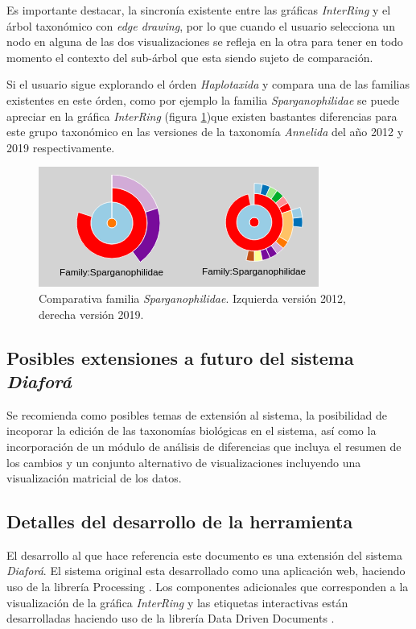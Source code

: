 \documentclass[journal]{IEEEtran}
\begin{document}
Es importante destacar, la sincronía existente entre las gráficas \emph{InterRing} y el árbol taxonómico con \emph{edge drawing}, por lo que cuando el usuario 
selecciona un nodo en alguna de las dos visualizaciones se refleja en la otra para tener en todo momento el contexto del sub-árbol que esta siendo sujeto de comparación.

Si el usuario sigue explorando el órden \emph{Haplotaxida} y compara una de las familias existentes en este órden, como por ejemplo la familia \emph{Sparganophilidae
} se puede apreciar en la gráfica \emph{InterRing} (figura \ref{sparg_fam})que existen bastantes diferencias para este grupo taxonómico en las versiones de la taxonomía \emph{Annelida} del año 2012 y 2019 respectivamente.

\begin{figure}[]
  \centering
  \includegraphics[scale=2.3]{Sparganophilidae_interring.png}
  \caption{Comparativa familia \emph{Sparganophilidae}. Izquierda versión 2012, derecha versión 2019.}
  \label{sparg_fam}
\end{figure}
\subsection{Posibles extensiones a futuro del sistema \emph{Diaforá}}

Se recomienda como posibles temas de extensión al sistema, la posibilidad de incoporar la edición 
de las taxonomías biológicas en el sistema, así como la incorporación de un módulo de análisis de diferencias
que incluya el resumen de los cambios y un conjunto alternativo de visualizaciones incluyendo una visualización matricial
de los datos.

\subsection{Detalles del desarrollo de la herramienta}
El desarrollo al que hace referencia este documento es una extensión del sistema \emph{Diaforá}\cite{sancho_diafora}.
El sistema original esta desarrollado como una aplicación web, 
haciendo uso de la librería Processing \cite{p5js2020}.
Los componentes adicionales que corresponden a la visualización de la gráfica \emph{InterRing} y las etiquetas
interactivas están desarrolladas haciendo uso de la librería Data Driven Documents \cite{DDD}.
\end{document}
